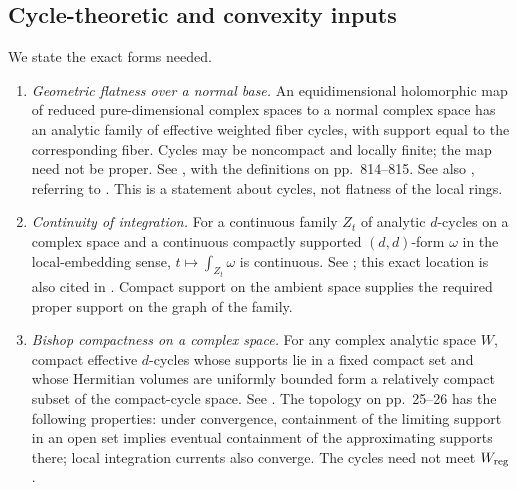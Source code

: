 \documentclass[11pt]{amsart}
\theoremstyle{definition}
\theoremstyle{remark}
\numberwithin{equation}{section}
\begin{document}
\subsection{Cycle-theoretic and convexity inputs}
We state the exact forms needed.
\begin{enumerate}[label=\textup{(C\arabic*)},ref=C\arabic*,leftmargin=*]
\item\label{curve:ext:gf}
\emph{Geometric flatness over a normal base.}
An equidimensional holomorphic map of reduced pure-dimensional complex
spaces to a normal complex space has an analytic family of effective
weighted fiber cycles, with support equal to the corresponding fiber.
Cycles may be noncompact and locally finite; the map need not be proper.
See \cite[Chapter~I, \S1(b), p.~816]{BarletMagnusson1998}, with the definitions on
pp.~814--815. See also \cite[Definition~1.1.1 and following
Remark~(ii); author preprint pp.~3--4]{BarletMagnusson2019}, referring to
\cite[Chapter~IV, Theorem~3.4.1]{BarletMagnusson2014}.
This is a statement about cycles, not flatness of the local rings.

\item\label{curve:ext:integrals}
\emph{Continuity of integration.}
For a continuous family \(Z_t\) of analytic \(d\)-cycles on a complex
space and a continuous compactly supported \((d,d)\)-form \(\omega\)
in the local-embedding sense, \(t\mapsto\int_{Z_t}\omega\)
is continuous.
See \cite[Chapter~IV, Proposition~2.3.1]{BarletMagnusson2014};
this exact location is also cited in
\cite[proof of Theorem~4.0.7, Step~4, author preprint p.~21]{BarletAlpha2017}.
Compact support on the ambient space supplies the required proper
support on the graph of the family.

\item\label{curve:ext:bishop}
\emph{Bishop compactness on a complex space.}
For any complex analytic space \(W\), compact effective \(d\)-cycles
whose supports lie in a fixed compact set and whose Hermitian volumes
are uniformly bounded form a relatively compact subset of the
compact-cycle space.
See \cite[Theorem~1, p.~26]{Barlet1999}.
The topology on pp.~25--26 has the following properties:
under convergence, containment of the limiting support in an open
set implies eventual containment of the approximating supports there;
local integration currents also converge.
The cycles need not meet \(W_{\rm reg}\).
\end{enumerate}
\end{document}
